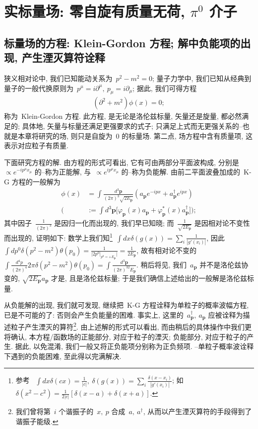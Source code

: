 \section{实标量场: 零自旋有质量无荷, $\pi^0$ 介子}
\subsection{标量场的方程: Klein-Gordon 方程; 解中负能项的出现, 产生湮灭算符诠释}
狭义相对论中, 我们已知能动关系为~$p^2-m^2=0$; 量子力学中, 我们已知从经典到量子的一般代换原则为~$p^\mu=i\partial^\mu,~p_\mu=i\partial_\mu$; 据此, 我们可得方程
\begin{align}
(\partial^2+m^2)\phi(x)=0;
\end{align}
称为~Klein-Gordon 方程. 此方程, 是无论是洛伦兹标量, 矢量还是旋量, 都必然满足的; 具体地, 矢量与标量还满足更强要求的式子; 只满足上式而无更强关系的--也就是本章将研究的场, 则只是自旋为~0 的标量场. 第二点, 场方程中含有质量项, 这表示对应粒子有质量.

下面研究方程的解. 由方程的形式可看出, 它有可由两部分平面波构成, 分别是~$\propto e^{-ip^\mu x_\mu}$ 的--称为正能解, 与~$\propto e^{ip^\mu x_\mu}$ 的--称为负能解. 由前二平面波叠加成的~K-G 方程的一般解为
\begin{align}\label{so of kg}
\phi(x)&=\int\frac{d^3\bm{p}}{(2\pi)^3\sqrt{2E_{\bm{p}}}}\left(a_{\bm{p}}e^{-ipx}+a^\dag_{\bm{p}}e^{ipx}\right)\nonumber\\
\bigg(&:=\int d^3\bm{p}\big[\varphi_{\bm{p}}(x) a_{\bm{p}}+\varphi^*_{\bm{p}}(x) a^\dag_{\bm{p}}\big]\bigg);
\end{align}
其中因子~$\frac{1}{(2\pi)^3}$ 是因归一化而出现的, 我们早已知晓; 而~$\frac{1}{\sqrt{2E_{\bm{p}}}}$ 是因相对论不变性而出现的, 证明如下: 数学上我们知\footnote{参考~ $\int dx\delta(cx)=\frac{1}{|c|},~\delta(g(x))=\sum_i\frac{\delta(x-x_i)}{|g'(x_i)|}$; 如~$\delta(x^2-c^2)=\frac{1}{2|c|}[\delta(x-a)+\delta(x+a)]$.}~$\int dx\delta(g(x))=\sum_i\frac{1}{|g'(x_i)|}$, 因此~$\int dp^0\delta(p^2-m^2)\theta(p_0)=\frac{1}{|2p^0|_{p^0=+E_{\bm{p}}}|}=\frac{1}{2E_{\bm{p}}}$, 故有相对论不变的~$\int \frac{d^4p}{(2\pi)^4}2\pi\delta(p^2-m^2)\theta(p_0)=\int\frac{d^3\bm{p}}{(2\pi)^32E_{\bm{p}}}$. 稍后将见, 我们~$a_{\bm{p}}$ 并不是洛伦兹协变的, $\sqrt{2E_{\bm{p}}}a_{\bm{p}}$ 才是, 且是洛伦兹标量; 于是我们确信上述给出的一般解是洛伦兹标量.




从负能解的出现, 我们就可发现, 继续把~K-G 方程诠释为单粒子的概率波幅方程, 已是不可能的了: 否则会产生负能量的困难. 事实上, 这里的~$a^\dag_{\bm{p}},~a_{\bm{p}}$ 应被诠释为描述粒子产生湮灭的算符\footnote{我们曾将第~$i$ 个谐振子的~$x,~p$ 合成~$a,~a^\dag$, 从而以产生湮灭算符的手段得到了谐振子能级.}. 由上述解的形式可以看出, 而由稍后的具体操作中我们更将确认, 本方程/函数场的正能部分, 对应于粒子的湮灭; 负能部分, 对应于粒子的产生. 据此, 以免混淆, 我们一般又将正负能项分别称为正负频项. --单粒子概率波诠释下遇到的负能困难, 至此得以完满解决.

